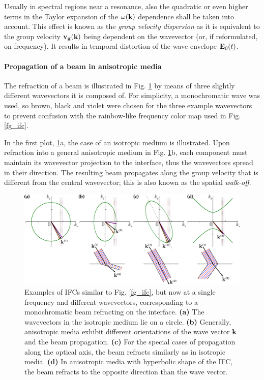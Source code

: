 Usually in spectral regions near a resonance, also the quadratic or even higher terms in the Taylor expansion of the $\omega({\mathbf{k}})$ dependence shall be taken into account. This effect is known as the \textit{group velocity dispersion} as it is equivalent to the group velocity ${\mathbf{v_g}}({\mathbf{k}})$ being dependent on the wavevector (or, if reformulated, on frequency). It results in temporal distortion of the wave envelope $\mathbf{E}_0(t)$.  %
\paragraph{Propagation of a beam in anisotropic media}  %
The refraction of a beam is illustrated in Fig. \ref{fg_ifc2} by means of three slightly different wavevectors it is composed of. For simplicity, a monochromatic wave was used, so brown, black and violet were chosen for the three example wavevectors to prevent confusion with the rainbow-like frequency color map used in Fig. \ref{fg_ifc}. 

In the first plot, \ref{fg_ifc2}a, the case of an isotropic medium is illustrated. Upon refraction into a general anisotropic medium in Fig. \ref{fg_ifc2}b, each component must maintain its wavevector projection to the interface, thus the wavevectors spread in their direction. The resulting beam propagates along the group velocity that is different from the central wavevector; %
this is also known as the spatial \textit{walk-off}.
\begin{figure}[ht] \caption{Examples of IFCs similar to Fig. \ref{fg_ifc}, but now at a single frequency and different wavevectors, corresponding to a monochromatic beam refracting on the interface. \textbf{(a)} The wavevectors in the isotropic medium lie on a circle.
		\textbf{(b)} Generally, anisotropic media exhibit different orientations of the wave vector ${\mathbf{k}}$ and the beam propagation. \textbf{(c)} For the special cases of propagation along the optical axis, the beam refracts similarly as in isotropic media.
 \textbf{(d)} In anisotropic media with hyperbolic shape of the IFC, the beam refracts to the opposite direction than the wave vector. } \label{fg_ifc2} \centering 
	\includegraphics[width=\textwidth]{img/ifc_kdispersion_hyp.pdf} 
\end{figure}

